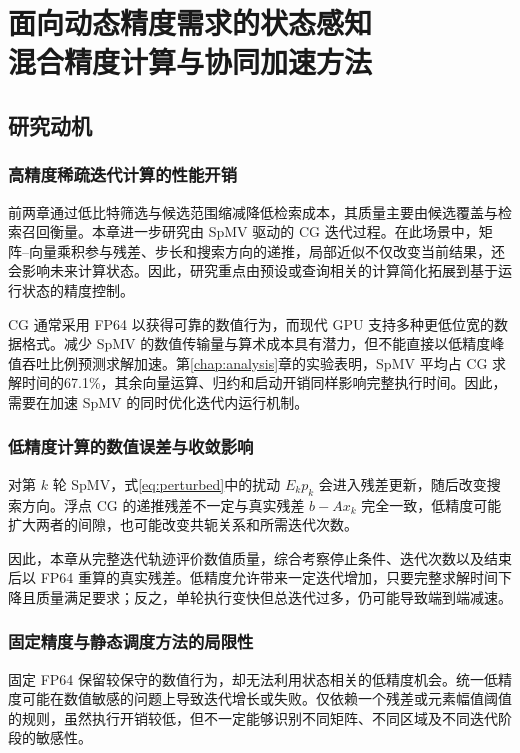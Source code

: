 \chapter[面向动态精度需求的状态感知混合精度计算与协同加速方法]{面向动态精度需求的状态感知\\混合精度计算与协同加速方法}\label{chap:evocg}
\section{研究动机}
\subsection{高精度稀疏迭代计算的性能开销}
前两章通过低比特筛选与候选范围缩减降低检索成本，其质量主要由候选覆盖与检索召回衡量。本章进一步研究由 SpMV 驱动的 CG 迭代过程。在此场景中，矩阵--向量乘积参与残差、步长和搜索方向的递推，局部近似不仅改变当前结果，还会影响未来计算状态。因此，研究重点由预设或查询相关的计算简化拓展到基于运行状态的精度控制。

CG 通常采用 FP64 以获得可靠的数值行为，而现代 GPU 支持多种更低位宽的数据格式。减少 SpMV 的数值传输量与算术成本具有潜力，但不能直接以低精度峰值吞吐比例预测求解加速。第\ref{chap:analysis}章的实验表明，SpMV 平均占 CG 求解时间的67.1\%，其余向量运算、归约和启动开销同样影响完整执行时间。因此，需要在加速 SpMV 的同时优化迭代内运行机制。

\subsection{低精度计算的数值误差与收敛影响}
对第 $k$ 轮 SpMV，式\eqref{eq:perturbed}中的扰动 $E_kp_k$ 会进入残差更新，随后改变搜索方向。浮点 CG 的递推残差不一定与真实残差 $b-Ax_k$ 完全一致，低精度可能扩大两者的间隙，也可能改变共轭关系和所需迭代次数\cite{greenbaum1989,simoncini2003,eshof2004}。

因此，本章从完整迭代轨迹评价数值质量，综合考察停止条件、迭代次数以及结束后以 FP64 重算的真实残差。低精度允许带来一定迭代增加，只要完整求解时间下降且质量满足要求；反之，单轮执行变快但总迭代过多，仍可能导致端到端减速。

\subsection{固定精度与静态调度方法的局限性}
固定 FP64 保留较保守的数值行为，却无法利用状态相关的低精度机会。统一低精度可能在数值敏感的问题上导致迭代增长或失败。仅依赖一个残差或元素幅值阈值的规则，虽然执行开销较低，但不一定能够识别不同矩阵、不同区域及不同迭代阶段的敏感性。


